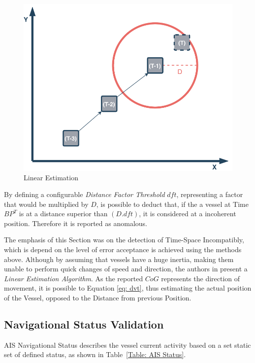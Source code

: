 \begin{figure}[H]
\centering
\includegraphics[scale = .6]{figures/Ch4/DVT.pdf}
\caption{Linear Estimation}
\label{fig: dvt}
\end{figure}

By defining a configurable \emph{Distance Factor Threshold} $dft$, representing a factor that would be multiplied by $D$, is possible to deduct that, if the a vessel at Time $BP^{T}$ is at a distance superior than $(D.dft)$, it is considered at a incoherent position. Therefore it is reported as anomalous.

The emphasis of this Section was on the detection of Time-Space Incompatibly, which is depend on the level of error acceptance is achieved using the methods above. 
Although by assuming that vessels have a huge inertia, making them unable to perform quick changes of speed and direction, the authors in \cite{Sadowski2015AlgorithmsCompression} present a \emph{Linear Estimation Algorithm}.
As the reported $CoG$ represents the direction of movement, it is possible to Equation \ref{eq: dvt}, thus estimating the actual position of the Vessel, opposed to the Distance from previous Position. %

\subsection{Navigational Status Validation}
\label{subsection: 4 Navigational Status Validation}
AIS Navigational Status describes the vessel current activity based on a set static set of defined status, as shown in Table~\ref{Table: AIS Status}.

